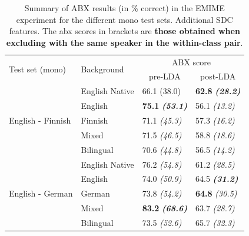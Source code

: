 \begin{table}[h!]
\centering
\begin{tabular}{@{}llll@{}}
\toprule
\multirow{2}{*}{Test set (mono)} & \multirow{2}{*}{Background} & \multicolumn{2}{c}{ABX score} \\ \cline{3-4}
 &  & \multicolumn{1}{c}{pre-LDA} & \multicolumn{1}{c}{post-LDA} \\ \midrule
\multirow{5}{*}{English - Finnish} & English Native & 66.1 (38.0) & \textbf{62.8} \textbf{\textit{(28.2)}} \\
 & English & \textbf{75.1} \textbf{\textit{(53.1)}} & 56.1 \textit{(13.2)} \\
 & Finnish & 71.1 \textit{(45.3)} & 57.3 \textit{(16.2)} \\
 & Mixed & 71.5 \textit{(46.5)} & 58.8 \textit{(18.6)} \\
 & Bilingual & 70.6 \textit{(44.8)} & 56.5 \textit{(14.2)} \\ \midrule
\multirow{5}{*}{English - German} & English Native & 76.2 \textit{(54.8)} & 61.2 \textit{(28.5)} \\
 & English & 74.0 \textit{(50.9)} & 64.5 \textbf{\textit{(31.2)}} \\
 & German & 73.8 \textit{(54.2)} & \textbf{64.8} \textit{(30.5)} \\
 & Mixed & \textbf{83.2} \textbf{\textit{(68.6)}} & 63.7 \textit{(28.7)} \\
 & Bilingual & 73.5 \textit{(52.6)} & 65.7 \textit{(32.3)} \\ \bottomrule
\end{tabular}
\caption{Summary of ABX results (in \% correct) in the EMIME experiment for the different mono test sets.  Additional SDC features. The abx scores in brackets are \textbf{those obtained when excluding with the same speaker in the within-class pair}. }
\label{Table: xxx}
\end{table}







